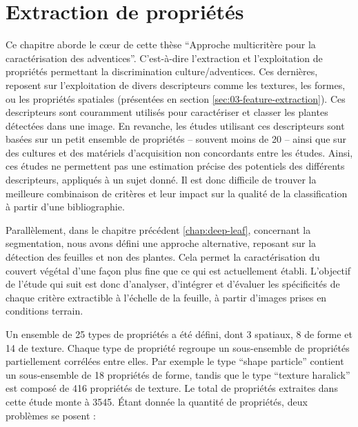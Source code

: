 \documentclass[../thesis.tex]{subfiles}
\begin{document}
	\chapter{Extraction de propriétés}
    \label{chap:feature-extraction}
	
	Ce chapitre aborde le cœur de cette thèse ``Approche multicritère pour la caractérisation des adventices''. C'est-à-dire l'extraction et l'exploitation de propriétés permettant la discrimination culture/adventices. Ces dernières, reposent sur l'exploitation de divers descripteurs comme les textures, les formes, ou les propriétés spatiales (présentées en section \ref{sec:03-feature-extraction}). Ces descripteurs sont couramment utilisés \cite{Griepentrog2005, Gao2013ResearchOW, XueJinru, rs10050761, smartcities3030039, mekhalfa2021supervised, wu2021review} pour caractériser et classer les plantes détectées dans une image. En revanche, les études utilisant ces descripteurs sont basées sur un petit ensemble de propriétés -- souvent moins de 20 -- ainsi que sur des cultures et des matériels d'acquisition non concordants entre les études. Ainsi, ces études ne permettent pas une estimation précise des potentiels des différents descripteurs, appliqués à un sujet donné. Il est donc difficile de trouver la meilleure combinaison de critères et leur impact sur la qualité de la classification à partir d'une bibliographie.
    
    Parallèlement, dans le chapitre précédent \ref{chap:deep-leaf}, concernant la segmentation, nous avons défini une approche alternative, reposant sur la détection des feuilles et non des plantes. Cela permet la caractérisation du couvert végétal d'une façon plus fine que ce qui est actuellement établi. L'objectif de l'étude qui suit est donc d'analyser, d'intégrer et d'évaluer les spécificités de chaque critère extractible à l'échelle de la feuille, à partir d'images prises en conditions terrain.
    
    Un ensemble de 25 types de propriétés a été défini, dont 3 spatiaux, 8 de forme et 14 de texture. Chaque type de propriété regroupe un sous-ensemble de propriétés partiellement corrélées entre elles. Par exemple le type ``shape particle'' contient un sous-ensemble de 18 propriétés de forme, tandis que le type ``texture haralick'' est composé de 416 propriétés de texture. Le total de propriétés extraites dans cette étude monte à 3545. Étant donnée la quantité de propriétés, deux problèmes se posent :
    
\end{document}
